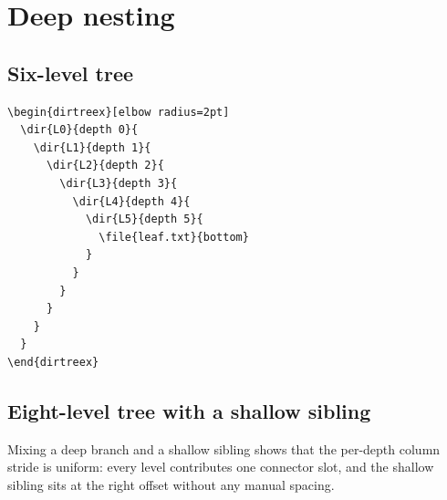 \documentclass[11pt]{article}
\begin{document}
\begin{dirtreex}[elbow radius=3pt]
\end{dirtreex}

\clearpage

\section{Deep nesting}

\subsection{Six-level tree}

\begin{Verbatim}
\begin{dirtreex}[elbow radius=2pt]
  \dir{L0}{depth 0}{
    \dir{L1}{depth 1}{
      \dir{L2}{depth 2}{
        \dir{L3}{depth 3}{
          \dir{L4}{depth 4}{
            \dir{L5}{depth 5}{
              \file{leaf.txt}{bottom}
            }
          }
        }
      }
    }
  }
\end{dirtreex}
\end{Verbatim}

\begin{dirtreex}[elbow radius=2pt]
\end{dirtreex}

\subsection{Eight-level tree with a shallow sibling}

Mixing a deep branch and a shallow sibling shows that the per-depth column stride is uniform: every level contributes one connector slot, and the shallow sibling sits at the right offset without any manual spacing.
\end{document}
